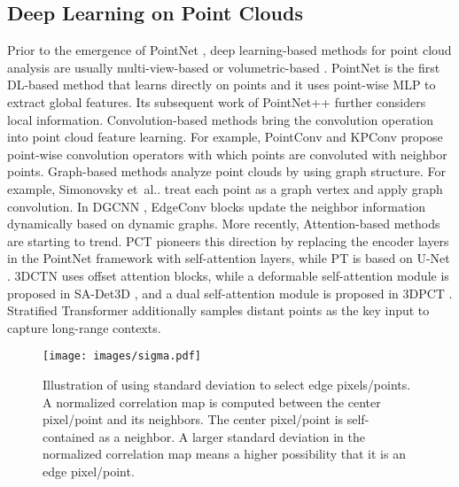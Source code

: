 \documentclass[10pt,twocolumn,letterpaper]{article}
\makeatletter
\DeclareRobustCommand\onedot{\futurelet\@let@token\@onedot}
\def\@onedot{\ifx\@let@token.\else.\null\fi\xspace}
\def\etal{et~al\onedot}
\makeatother
\begin{document}
\subsection{Deep Learning on Point Clouds}
Prior to the emergence of PointNet \cite{Qi2017PointNetDL}, deep learning-based methods for point cloud analysis are usually multi-view-based \cite{lawin2017deep, boulch2017unstructured, audebert2016semantic, tatarchenko2018tangent} or volumetric-based \cite{maturana2015voxnet, jiang2018pointsift, le2018pointgrid}. 
PointNet \cite{Qi2017PointNetDL} is the first DL-based method that learns directly on points and it uses point-wise MLP to extract global features. Its subsequent work of PointNet++ \cite{Qi2017PointNetDH} further considers local information. Convolution-based methods \cite{Zhao2019PointWeb, Wu2019PointConvDC, Thomas2019KPConvFA, Li2018PointCNNCO, Lin2020FPConv, Xu2021PAConvPA, Wiersma2021DeltaConvAP} bring the convolution operation into point cloud feature learning. For example, PointConv\cite{Wu2019PointConvDC} and KPConv \cite{Thomas2019KPConvFA} propose point-wise convolution operators with which points are convoluted with neighbor points. 
Graph-based methods \cite{Wang2019DynamicGC, Liu2019RelationShapeCN, Zhang2021LinkedDG, Xu2020GridGCN, Chen2021GAPNetGA, Liang20203DIE, Lin2020Convolution} analyze point clouds by using graph structure. For example, Simonovsky \etal \cite{simonovsky2017dynamic} treat each point as a graph vertex and apply graph convolution. In DGCNN \cite{Wang2019DynamicGC}, EdgeConv blocks update the neighbor information dynamically based on dynamic graphs. 
More recently, Attention-based methods \cite{Guo2021PCTPC, Engel2021PointT, Hu2020RandLANetES, Pan20213DOD, Bhattacharyya2021SADet3DSB, Cheng2021PatchFormerAV, Lu20223DCTN3C, Lu20223DPCT3P} are starting to trend. PCT \cite{Guo2021PCTPC} pioneers this direction by replacing the encoder layers in the PointNet framework with self-attention layers, while PT \cite{Zhao2021PointT} is based on U-Net \cite{Ronneberger2015UNetCN}. 3DCTN \cite{Lu20223DCTN3C} uses offset attention blocks, while a deformable self-attention module is proposed in SA-Det3D \cite{Bhattacharyya2021SADet3DSB}, and a dual self-attention module is proposed in 3DPCT \cite{Lu20223DPCT3P}. 
Stratified Transformer \cite{Lai2022StratifiedTF} additionally samples distant points as the key input to capture long-range contexts. 


\begin{figure}[t]
    \centering
    \texttt{[image: images/sigma.pdf]}
    \caption{Illustration of using standard deviation to select edge pixels/points. A normalized correlation map is computed between the center pixel/point and its neighbors. The center pixel/point is self-contained as a neighbor. A larger standard deviation in the normalized correlation map means a higher possibility that it is an edge pixel/point. \vspace{-0.2cm}}
    \label{fig:ds_sigma}
\end{figure}
\end{document}
